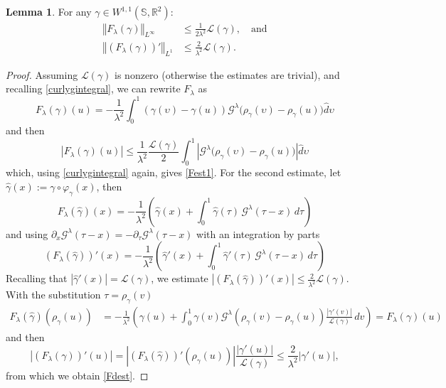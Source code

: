 \documentclass[a4paper,11pt]{amsart}
\theoremstyle{definition}\newtheorem*{definition}{Definition}
\theoremstyle{definition} \newtheorem{proposition}[theorem]{Proposition}
\theoremstyle{definition}\newtheorem{lemma}[theorem]{Lemma}
\theoremstyle{definition}\newtheorem{corollary}[theorem]{Corollary}
\theoremstyle{definition}\newtheorem{example}{Example}
\theoremstyle{remark}\newtheorem*{remark}{Remark}
\def\R{\mathbb{R}}
\def\S{\mathbb{S}}
\newcommand{\norm}[1]{{\left \Vert {#1}\right \Vert}}
\newcommand{\abs}[1]{\left | {#1}\right |}
\def\length{\mathcal L}
\begin{document}
\begin{lemma}\label{bounds}
For any $\gamma\in W^{1,1}(\S,\R^2)$:
\begin{align}\label{Fest1}
\norm{F_\lambda(\gamma)}_{L^\infty}& \leq \frac{1}{2\lambda^2 }\length(\gamma), \quad \text{and} \\ 
\norm{(F_\lambda(\gamma))'}_{L^1}&\leq \frac{2}{\lambda^2}\length(\gamma).  \label{Fdest}
\end{align}
\end{lemma}
\begin{proof}
Assuming $\length(\gamma)$ is nonzero (otherwise the estimates are trivial), and recalling \eqref{curlygintegral}, we can rewrite $F_\lambda$ as 
\begin{equation}\label{eq:Fmod}
F_\lambda(\gamma)(u)=-\frac{1}{\lambda^2} \int_0^1(\gamma(\upsilon)-\gamma(u))\mathcal{G}^\lambda \big(\rho_\gamma(\upsilon)-\rho_\gamma(u)\big) \hat d\upsilon
\end{equation}
and then
\[
\abs{F_\lambda(\gamma)(u)}\leq \frac{1}{\lambda^2}\frac{\length(\gamma)}{2}\int_0^1 \abs{\mathcal{G}^\lambda \big(\rho_\gamma(\upsilon)-\rho_\gamma(u)\big)} \hat d\upsilon
\]
which, using \eqref{curlygintegral} again, gives \eqref{Fest1}.
For the second estimate, let $\hat{\gamma}(x) := \gamma \circ \varphi_{\gamma}(x)$, then
\[F_\lambda(\hat{\gamma})(x) = -\frac{1}{\lambda^2} \left( \hat{\gamma}(x) + \int_0^1 \hat{\gamma}(\tau)\, \mathcal G^\lambda(\tau - x)\, d\tau \right)\]
and using $\partial_x\mathcal G^\lambda(\tau-x)=-\partial_\tau\mathcal G^\lambda(\tau-x)$ with an integration by parts
\begin{equation}\label{GIP}
(F_\lambda(\hat{\gamma}))'(x) = -\frac{1}{\lambda^2} \left( \hat{\gamma}'(x) + \int_0^1 \hat{\gamma}'(\tau)\, \mathcal G^\lambda(\tau - x)\, d\tau \right)
\end{equation}
Recalling that $|\hat{\gamma}'(x)| = \mathcal{L}(\gamma)$, we estimate $|(F_\lambda(\hat{\gamma}))'(x)| \leq \frac{2}{\lambda^2} \mathcal{L}(\gamma)$. With the substitution $\tau = \rho_\gamma(v)$
\begin{equation}\label{Finvariance}
\begin{aligned} 
F_\lambda(\hat{\gamma})(\rho_\gamma(u)) &= -\frac{1}{\lambda^2} \left( \gamma(u) + \int_0^1 \gamma(v) \mathcal{G}^\lambda(\rho_\gamma(v) - \rho_\gamma(u)) \frac{|\gamma'(v)|}{\mathcal{L}(\gamma)} \, dv \right)
= F_\lambda(\gamma)(u) 
\end{aligned}
\end{equation}
and then
\begin{equation}\label{Fdashest}
|(F_\lambda(\gamma))'(u)| =  |(F_\lambda(\hat{\gamma}))'(\rho_\gamma(u))|\frac{|\gamma'(u)|}{\mathcal{L}(\gamma)} \leq \frac{2}{\lambda^2} |\gamma'(u)|,
\end{equation}
from which we obtain \eqref{Fdest}.
\end{proof}
\end{document}
